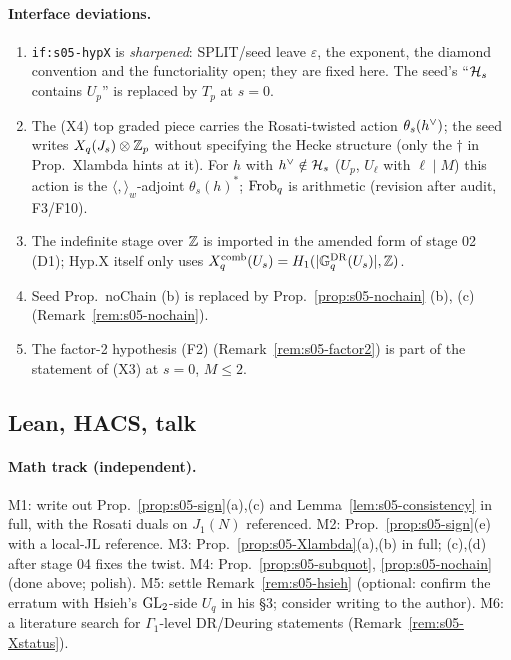 \paragraph{Interface deviations.}
\begin{enumerate}[label=D\arabic*.]
\item \texttt{if:s05-hypX} is \emph{sharpened}: SPLIT/seed leave $\varepsilon$, the exponent, the diamond convention and the
  functoriality open; they are fixed here. The seed's ``$\mathcal{H}_s$ contains $U_p$'' is replaced by $T_p$ at $s=0$.
\item The (X4) top graded piece carries the Rosati-twisted action $\theta_s(h^\vee)$; the seed writes $X_q(J_s)\otimes\mathbb{Z}_p$ without
  specifying the Hecke structure (only the $\dagger$ in Prop.~Xlambda hints at it). For $h$ with $h^\vee\notin\mathcal{H}_s$ ($U_p$,
  $U_\ell$ with $\ell\mid M$) this action is the $\langle,\rangle_w$-adjoint $\theta_s(h)^*$; $\mathrm{Frob}_q$ is arithmetic (revision after
  audit, F3/F10).
\item The indefinite stage over $\mathbb{Z}$ is imported in the amended form of stage 02 (D1); Hyp.X itself only uses
  $X^{\mathrm{comb}}_q(U_s)=H_1(|\mathbb{G}^{\mathrm{DR}}_q(U_s)|,\mathbb{Z})$.
\item Seed Prop.~noChain (b) is replaced by Prop.~\ref{prop:s05-nochain} (b), (c) (Remark~\ref{rem:s05-nochain}).
\item The factor-2 hypothesis (F2) (Remark~\ref{rem:s05-factor2}) is part of the statement of (X3) at $s=0$, $M\le2$.
\end{enumerate}

\subsection{Lean, HACS, talk}
\paragraph{Math track (independent).}
M1: write out Prop.~\ref{prop:s05-sign}(a),(c) and Lemma~\ref{lem:s05-consistency} in full, with the Rosati duals on $J_1(N)$
referenced. M2: Prop.~\ref{prop:s05-sign}(e) with a local-JL reference. M3: Prop.~\ref{prop:s05-Xlambda}(a),(b) in full;
(c),(d) after stage 04 fixes the twist. M4: Prop.~\ref{prop:s05-subquot}, \ref{prop:s05-nochain} (done above; polish). M5: settle
Remark~\ref{rem:s05-hsieh} (optional: confirm the erratum with Hsieh's $\mathrm{GL}_2$-side $U_q$ in his \S3; consider writing to the
author).  M6: a literature search for $\Gamma_1$-level
DR/Deuring statements (Remark~\ref{rem:s05-Xstatus}).

